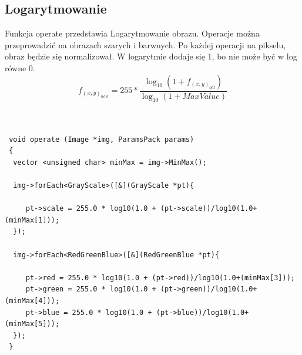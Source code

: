 \documentclass{article}
\begin{document}
\FloatBarrier
\subsection{Logarytmowanie}
Funkcja operate przedstawia Logarytmowanie obrazu. Operacje można przeprowadzić na obrazach szarych i barwnych. Po każdej operacji na pikselu, obraz będzie się normalizował.
W logarytmie dodaje się 1, bo nie może być w log równe 0.
\begin{equation*}
f_(x,y)_{new} = 255*\frac{\log_{10}{(1+f_(x,y)_{old})}}{\log_{10}{(1+MaxValue)}}
\end{equation*}\\
\begin{Verbatim}[frame=single,label=Logarytmowanie (Source Code)]

 void operate (Image *img, ParamsPack params)
 {
  vector <unsigned char> minMax = img->MinMax();
	
  img->forEach<GrayScale>([&](GrayScale *pt){
  
     pt->scale = 255.0 * log10(1.0 + (pt->scale))/log10(1.0+(minMax[1]));
  });
	
  img->forEach<RedGreenBlue>([&](RedGreenBlue *pt){
  
     pt->red = 255.0 * log10(1.0 + (pt->red))/log10(1.0+(minMax[3]));
     pt->green = 255.0 * log10(1.0 + (pt->green))/log10(1.0+(minMax[4]));
     pt->blue = 255.0 * log10(1.0 + (pt->blue))/log10(1.0+(minMax[5]));
  });
 }
    
\end{Verbatim}
\end{document}
